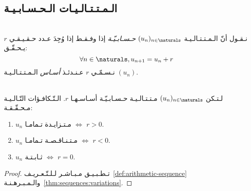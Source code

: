 \subsection{الـمـتـتـالـيـات الـحـسـابـيـة}%
\label{subsec:sequences:special:arithmetic}

\begin{definition}%
    \label{def:arithmetic-sequence}\ \\
    نـقـول أنّ الـمـتـتـالـيـة \((u_n)_{n \in \naturals}\) \emph{حـسـابـيّـة}
    إذا وفـقـط إذا وُجِدَ عـدد حـقـيـقـي \(r\) يـحـقّـق:
    \[\forall n \in \naturals, u_{n+1} = u_n + r\]
    نـسـمّـي \(r\) عـنـدئـذ \emph{أسـاس } الـمـتـتـالـيـة \((u_n)\).
\end{definition}

\begin{proposition}%
    \label{prop:arithmetic-sequence:variation}\ \\
    لـتـكن \((u_n)_{n \in \naturals}\) مـتـتـالـيـة حـسـابـيّـة أسـاسـهـا \(r\).
    الـتّـكافـؤات التّـالـيـة مـحـقّـقـة:
    \begin{enumerate}
        \item \(u_n\) مـتـزايـدة تـمامـا \(\iff\) \(r > 0\).
        \item \(u_n\) مـتـنـاقـصـة تـمامـا \(\iff\) \(r < 0\).
        \item \(u_n\) ثـابـتـة \(\iff\) \(r = 0\).
    \end{enumerate}
\end{proposition}
\begin{proof}
    تـطـبـيـق مـبـاشـر لـلـتّـعـريـف~\ref{def:arithmetic-sequence}
    والـمـبـرهـنـة~\ref{thm:sequences:variations}.
\end{proof}
